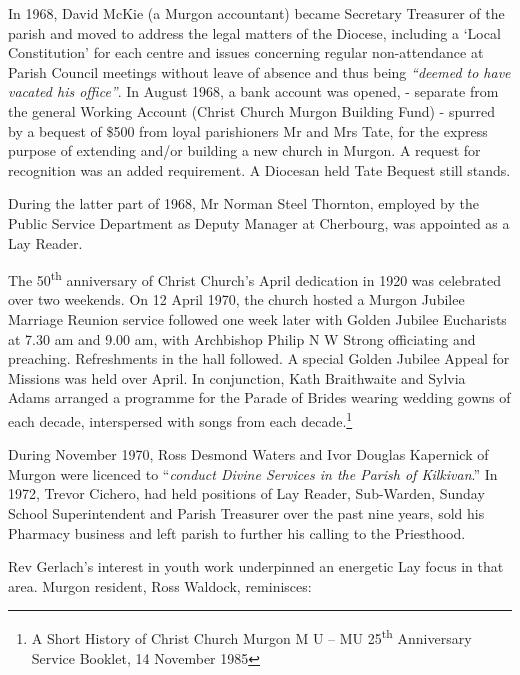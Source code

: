 In 1968, David McKie (a Murgon accountant) became Secretary Treasurer of the parish and moved to address the legal matters of the Diocese, including a `Local Constitution' for each centre and issues concerning regular non-attendance at Parish Council meetings without leave of absence and thus being \emph{``deemed to have vacated his office''}. In August 1968, a bank account was opened, - separate from the general Working Account (Christ Church Murgon Building Fund) - spurred by a bequest of \$500 from loyal parishioners Mr and Mrs Tate, for the express purpose of extending and/or building a new church in Murgon. A request for recognition was an added requirement. A Diocesan held Tate Bequest still stands.



During the latter part of 1968, Mr Norman Steel Thornton, employed by the Public Service Department as Deputy Manager at Cherbourg, was appointed as a Lay Reader.



The 50\textsuperscript{th} anniversary of Christ Church's April dedication in 1920 was celebrated over two weekends. On 12 April 1970, the church hosted a Murgon Jubilee Marriage Reunion service followed one week later with Golden Jubilee Eucharists at 7.30 am and 9.00 am, with Archbishop Philip N W Strong officiating and preaching. Refreshments in the hall followed. A special Golden Jubilee Appeal for Missions was held over April. In conjunction, Kath Braithwaite and Sylvia Adams arranged a programme for the Parade of Brides wearing wedding gowns of each decade, interspersed with songs from each decade.\footnote{A Short History of Christ Church Murgon M U -- MU 25\textsuperscript{th} Anniversary Service Booklet, 14 November 1985}


During November 1970, Ross Desmond Waters and Ivor Douglas Kapernick of Murgon were licenced to ``\emph{conduct Divine Services in the Parish of Kilkivan}.'' In 1972, Trevor Cichero, had held positions of Lay Reader, Sub-Warden, Sunday School Superintendent and Parish Treasurer over the past nine years, sold his Pharmacy business and left parish to further his calling to the Priesthood.



Rev Gerlach's interest in youth work underpinned an energetic Lay focus in that area. Murgon resident, Ross Waldock, reminisces:



